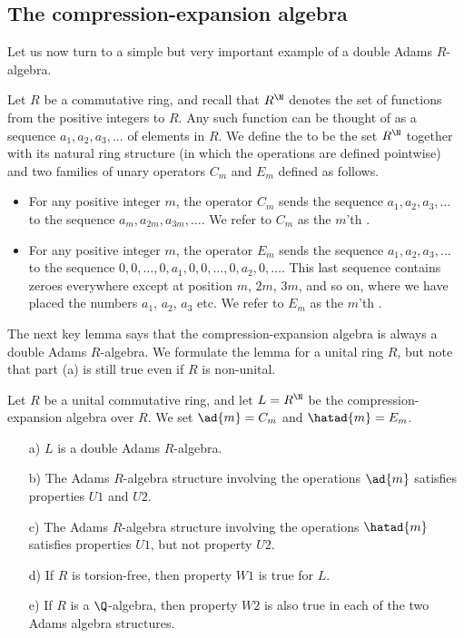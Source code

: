 \subsection{The compression-expansion algebra}

Let us now turn to a simple but very important example of a double Adams $R$-algebra.

\begin{definition}
Let $R$ be a commutative ring, and recall that $R^{\N}$ denotes the set of functions from the positive integers to $R$. Any such function can be thought of as a sequence $a_1, a_2, a_3, \ldots$ of elements in $R$. We define the   to be the set $R^{\N}$ together with its natural ring structure (in which the operations are defined pointwise) and two families of unary operators $C_m$ and $E_m$ defined as follows.
\begin{itemize}
\item For any positive integer $m$, the operator $C_m$ sends the sequence $a_1, a_2, a_3, \ldots$ to the sequence $a_{m}, a_{2m}, a_{3m}, \ldots$. We refer to $C_m$ as the $m$'th .
\item For any positive integer $m$, the operator $E_m$ sends the sequence $a_1, a_2, a_3, \ldots$ to the sequence $0, 0, \ldots, 0, a_1, 0, 0, \ldots, 0, a_2, 0, \ldots$. This last sequence contains zeroes everywhere except at position $m$, $2m$, $3m$, and so on, where we have placed the numbers $a_1$, $a_2$, $a_3$ etc. We refer to $E_m$ as the $m$'th .
\end{itemize}
\end{definition}

The next key lemma says that the compression-expansion algebra is always a double Adams $R$-algebra. We formulate the lemma for a unital ring $R$, but note that part (a) is still true even if $R$ is non-unital. 

\begin{lemma} \label{lemma:CE}
Let $R$ be a unital commutative ring, and let $L = R^{\N}$ be the compression-expansion algebra over $R$. We set $\ad{m} = C_m$ and $\hatad{m} = E_m$.
\begin{itemize}
\item[a)] $L$ is a double Adams $R$-algebra. 
\item[b)] The Adams $R$-algebra structure involving the operations $\ad{m}$ satisfies properties $U1$ and $U2$.
\item[c)] The Adams $R$-algebra structure involving the operations $\hatad{m}$ satisfies properties $U1$, but not property $U2$.
\item[d)] If $R$ is torsion-free, then property $W1$ is true for $L$.
\item[e)] If $R$ is a $\Q$-algebra, then property $W2$ is also true in each of the two Adams algebra structures.
\end{itemize}
\end{lemma}


